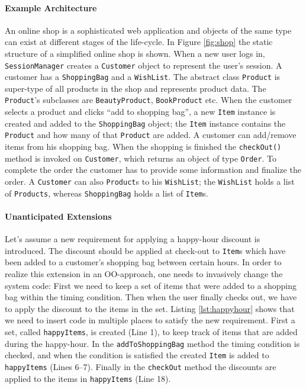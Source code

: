 \paragraph{Example Architecture}
An online shop is a sophisticated web application and objects of the same type can exist at different stages of the life-cycle. In Figure \ref{fig:shop} the static structure of a simplified online shop is shown. When a new user logs in, \texttt{SessionManager} creates a \texttt{Customer} object to represent the user's session. A customer has a \texttt{ShoppingBag} and a \texttt{WishList}. The abstract class \texttt{Product} is super-type of all products in the shop and represents product data. The \texttt{Product}'s subclasses are \texttt{BeautyProduct}, \texttt{BookProduct} etc. When the customer selects a product and clicks ``add to shopping bag'', a new \texttt{Item} instance is created and added to the \texttt{ShoppingBag} object; the \texttt{Item} instance contains the \texttt{Product} and how many of that \texttt{Product} are added. A customer can add/remove items from his shopping bag. When the shopping is finished the \texttt{checkOut()} method is invoked on \texttt{Customer}, which returns an object of type \texttt{Order}. To complete the order the customer has to provide some information and finalize the order. A \texttt{Customer} can also \texttt{Product}s to his \texttt{WishList}; the \texttt{WishList} holds a list of \texttt{Products}, whereas \texttt{ShoppingBag} holds a list of \texttt{Item}s.

\paragraph{Unanticipated Extensions}
Let's assume a new requirement for applying a happy-hour discount is introduced. The discount should be applied at check-out to \texttt{Item}s which have been added to a customer's shopping bag between certain hours.
In order to realize this extension in an OO-approach, one needs to invasively change the system code: First we need to keep a set of items that were added to a shopping bag within the timing condition. Then when the user finally checks out, we have to apply the discount to the items in the set. Listing \ref{lst:happyhour} shows that we need to insert code in multiple places to satisfy the new requirement. First a set, called \texttt{happyItems}, is created (Line 1), to keep track of items that are added during the happy-hour. In the \texttt{addToShoppingBag} method the timing condition is checked, and when the condition is satisfied the created \texttt{Item} is added to \texttt{happyItems} (Lines 6--7).  Finally in the \texttt{checkOut} method the discounts are applied to the items in \texttt{happyItems} (Line 18). 

